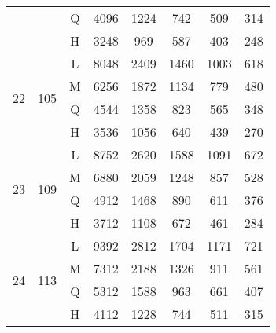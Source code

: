 \begin{table}[H]
\begin{tabular}{|c|c|c|c|c|c|c|c|}
                    &                      & Q & 4096 & 1224 & 742  & 509  & 314 \\ \cline{3-8}
                    &                      & H & 3248 & 969  & 587  & 403  & 248 \\ \hline
\multirow{4}{*}{22} & \multirow{4}{*}{105} & L & 8048 & 2409 & 1460 & 1003 & 618 \\ \cline{3-8}
                    &                      & M & 6256 & 1872 & 1134 & 779  & 480 \\ \cline{3-8}
                    &                      & Q & 4544 & 1358 & 823  & 565  & 348 \\ \cline{3-8}
                    &                      & H & 3536 & 1056 & 640  & 439  & 270 \\ \hline
\multirow{4}{*}{23} & \multirow{4}{*}{109} & L & 8752 & 2620 & 1588 & 1091 & 672 \\ \cline{3-8}
                    &                      & M & 6880 & 2059 & 1248 & 857  & 528 \\ \cline{3-8}
                    &                      & Q & 4912 & 1468 & 890  & 611  & 376 \\ \cline{3-8}
                    &                      & H & 3712 & 1108 & 672  & 461  & 284 \\ \hline
\multirow{4}{*}{24} & \multirow{4}{*}{113} & L & 9392 & 2812 & 1704 & 1171 & 721 \\ \cline{3-8}
                    &                      & M & 7312 & 2188 & 1326 & 911  & 561 \\ \cline{3-8}
                    &                      & Q & 5312 & 1588 & 963  & 661  & 407 \\ \cline{3-8}
                    &                      & H & 4112 & 1228 & 744  & 511  & 315 \\ \hline
\end{tabular}
\end{table}

